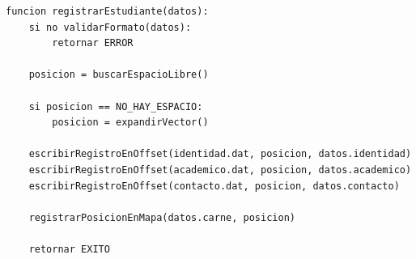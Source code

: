 \begin{lstlisting}[style=pseudocodigo]
funcion registrarEstudiante(datos):
    si no validarFormato(datos):
        retornar ERROR

    posicion = buscarEspacioLibre()

    si posicion == NO_HAY_ESPACIO:
        posicion = expandirVector()

    escribirRegistroEnOffset(identidad.dat, posicion, datos.identidad)
    escribirRegistroEnOffset(academico.dat, posicion, datos.academico)
    escribirRegistroEnOffset(contacto.dat, posicion, datos.contacto)

    registrarPosicionEnMapa(datos.carne, posicion)

    retornar EXITO
\end{lstlisting}
